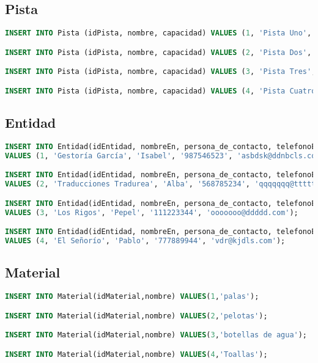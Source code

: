 \subsection{Pista}
\begin{lstlisting}[language=sql]
INSERT INTO Pista (idPista, nombre, capacidad) VALUES (1, 'Pista Uno', 6);

INSERT INTO Pista (idPista, nombre, capacidad) VALUES (2, 'Pista Dos', 16);

INSERT INTO Pista (idPista, nombre, capacidad) VALUES (3, 'Pista Tres', 8);

INSERT INTO Pista (idPista, nombre, capacidad) VALUES (4, 'Pista Cuatro', 7);
\end{lstlisting}

\subsection{Entidad}
\begin{lstlisting}[language=sql]
INSERT INTO Entidad(idEntidad, nombreEn, persona_de_contacto, telefonoEn, emailEn)
VALUES (1, 'Gestoría García', 'Isabel', '987546523', 'asbdsk@ddnbcls.com');

INSERT INTO Entidad(idEntidad, nombreEn, persona_de_contacto, telefonoEn, emailEn)
VALUES (2, 'Traducciones Tradurea', 'Alba', '568785234', 'qqqqqqq@ttttttt.com');

INSERT INTO Entidad(idEntidad, nombreEn, persona_de_contacto, telefonoEn, emailEn)
VALUES (3, 'Los Rigos', 'Pepel', '111223344', 'ooooooo@ddddd.com');

INSERT INTO Entidad(idEntidad, nombreEn, persona_de_contacto, telefonoEn, emailEn)
VALUES (4, 'El Señorío', 'Pablo', '777889944', 'vdr@kjdls.com');
\end{lstlisting}

\pagebreak

\subsection{Material}
\begin{lstlisting}[language=sql]
INSERT INTO Material(idMaterial,nombre) VALUES(1,'palas');

INSERT INTO Material(idMaterial,nombre) VALUES(2,'pelotas');

INSERT INTO Material(idMaterial,nombre) VALUES(3,'botellas de agua');

INSERT INTO Material(idMaterial,nombre) VALUES(4,'Toallas');
\end{lstlisting}

